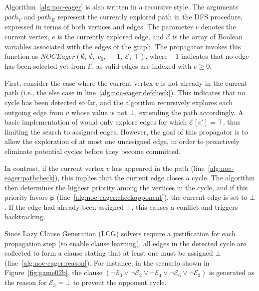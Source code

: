 \documentclass[a4paper,fleqn]{cas-sc}
\begin{document}
Algorithm~\ref{alg:noc-eager} is also written in a recursive style. The arguments $\mathit{path}_V$ and $\mathit{path}_E$ represent the currently explored path in the DFS procedure, expressed in terms of both vertices and edges. The parameter $v$ denotes the current vertex, $e$ is the currently explored edge, and $\mathcal{E}$ is the array of Boolean variables associated with the edges of the graph. The \noc propagator invokes this function as $\textit{NOCEager}(\emptyset,\ \emptyset,\ v_0,\ -1,\ \mathcal{E},\ \top)$, where $-1$ indicates that no edge has been selected yet from $\mathcal{E}$, as valid edges are indexed with $e \geq 0$.

First, consider the case where the current vertex $v$ is not already in the current path (i.e., the else case in line~\ref{alg:noc-eager:defcheck}). This indicates that no cycle has been detected so far, and the algorithm recursively explores each outgoing edge from $v$ whose value is not $\bot$, extending the path accordingly. A basic implementation of \noceager would only explore edges for which $\mathcal{E}[e'] = \top$, thus limiting the search to assigned edges. However, the goal of this propagator is to allow the exploration of at most one unassigned edge, in order to proactively eliminate potential cycles before they become committed.

In contrast, if the current vertex $v$ has appeared in the path (line~\ref{alg:noc-eager:pathcheck}), this implies that the current edge closes a cycle. The algorithm then determines the highest priority among the vertices in the cycle, and if this priority favors $\overline{\mathsf{p}}$ (line~\ref{alg:noc-eager:checkopponent}), the current edge is set to $\bot$. If the edge had already been assigned $\top$, this causes a conflict and triggers backtracking.

Since Lazy Clause Generation (LCG) solvers require a justification for each propagation step (to enable clause learning), all edges in the detected cycle are collected to form a clause stating that at least one must be assigned $\bot$ (line~\ref{alg:noc-eager:reason}). For instance, in the scenario shown in Figure~\ref{fig:game02b}, the clause $(\neg \mathcal{E}_0 \vee \neg \mathcal{E}_2 \vee \neg \mathcal{E}_4 \vee \neg \mathcal{E}_6 \vee \neg \mathcal{E}_3)$ is generated as the reason for $\mathcal{E}_3 = \bot$ to prevent the opponent cycle.
\end{document}
